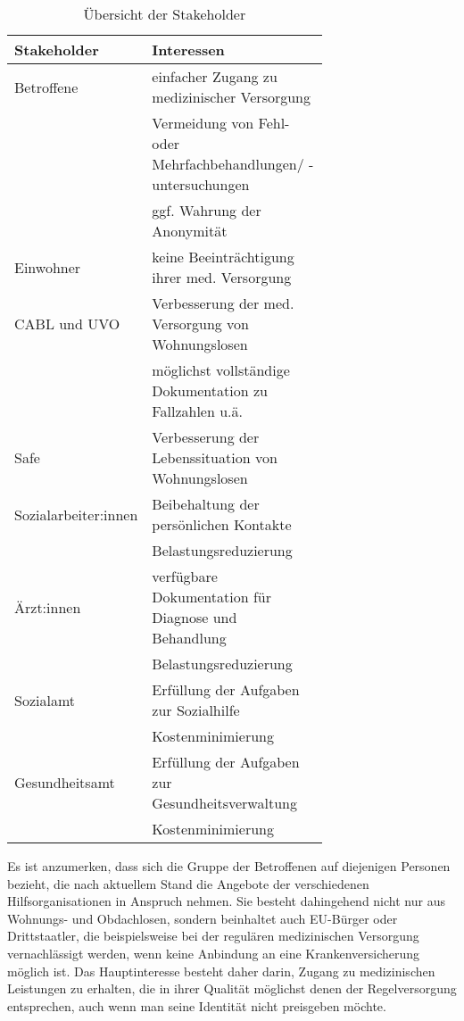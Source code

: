\begin{table}[ht]
	\centering
	\begin{tabulary}{\textwidth}{Lp{0.7\linewidth}}
		\toprule
		Stakeholder&				Interessen\\
		\midrule
		Betroffene&					einfacher Zugang zu medizinischer Versorgung\\
		&							Vermeidung von Fehl- oder Mehrfachbehandlungen/ -untersuchungen\\
		&							ggf. Wahrung der Anonymität\\
		Einwohner&					keine Beeinträchtigung ihrer med. Versorgung\\
		CABL und UVO&				Verbesserung der med. Versorgung von Wohnungslosen\\
		&							möglichst vollständige Dokumentation zu Fallzahlen u.ä.\\
		Safe&						Verbesserung der Lebenssituation von Wohnungslosen\\
		Sozialarbeiter:innen&		Beibehaltung der persönlichen Kontakte\\
		&							Belastungsreduzierung\\
		Ärzt:innen&					verfügbare Dokumentation für Diagnose und Behandlung\\
		&							Belastungsreduzierung\\
		Sozialamt&					Erfüllung der Aufgaben zur Sozialhilfe\\
		&							Kostenminimierung\\
		Gesundheitsamt&				Erfüllung der Aufgaben zur Gesundheitsverwaltung\\
		&							Kostenminimierung\\
		\bottomrule
	\end{tabulary}
	\caption[Stakeholder]{Übersicht der Stakeholder}
	\label{tab:stakeholder}
\end{table}

Es ist anzumerken, dass sich die Gruppe der Betroffenen auf diejenigen Personen bezieht, die nach aktuellem Stand die Angebote der verschiedenen Hilfsorganisationen in Anspruch nehmen. Sie besteht dahingehend nicht nur aus Wohnungs- und Obdachlosen, sondern beinhaltet auch EU-Bürger oder Drittstaatler, die beispielsweise bei der regulären medizinischen Versorgung vernachlässigt werden, wenn keine Anbindung an eine Krankenversicherung möglich ist. Das Hauptinteresse besteht daher darin, Zugang zu medizinischen Leistungen zu erhalten, die in ihrer Qualität möglichst denen der Regelversorgung entsprechen, auch wenn man seine Identität nicht preisgeben möchte.

